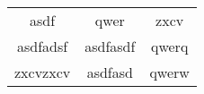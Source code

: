 \documentclass{article}
\begin{document}

\begin{tabular}{ccc}
    asdf & qwer & zxcv \\
    asdfadsf & asdfasdf & qwerq \\
    zxcvzxcv & asdfasd & qwerw \\
\end{tabular}


\end{document}
